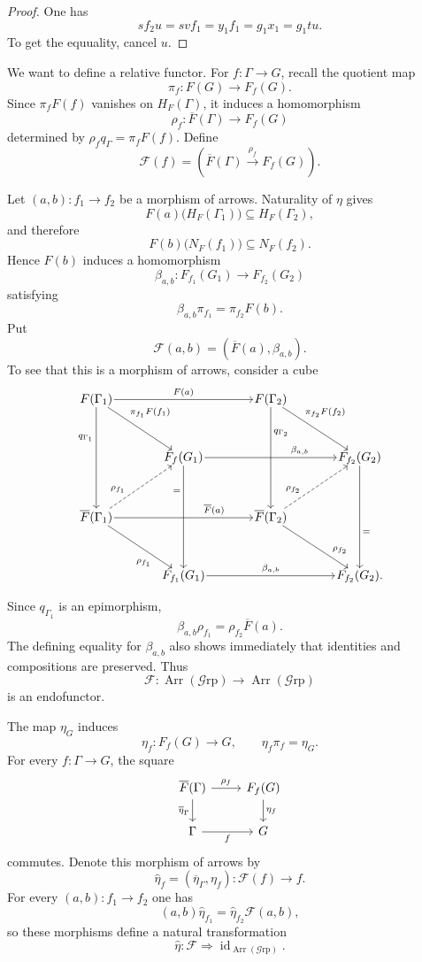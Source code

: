 \documentclass[10pt]{amsart}
\renewcommand{\*}{\cdot {\dots} \cdot}
\newcommand{\?}[1]{\overset{?}{#1}}
\newcommand{\id}{\operatorname{id}}
\newcommand{\Grp}{\mathcal{G}\text{rp}}
\numberwithin{equation}{section}
\begin{document}
\begin{proof}
One has
\[
sf_2u
=svf_1
=y_1f_1
=g_1x_1
=g_1tu.
\]
To get the equuality, cancel $u$.
\end{proof}
We want to define a relative functor. For $f\colon\Gamma\to G$, recall the quotient map
\[
\pi_f\colon F(G)\longrightarrow F_f(G).
\]
Since $\pi_fF(f)$ vanishes on $H_F(\Gamma)$, it induces a
homomorphism
\[
\rho_f\colon\overline F(\Gamma)\longrightarrow F_f(G)
\]
determined by $\rho_fq_\Gamma=\pi_fF(f)$.
Define
\[
\mathscr F(f)=
\left(
\overline F(\Gamma)\xrightarrow{\rho_f}F_f(G)
\right).
\]

Let $(a,b)\colon f_1\longrightarrow f_2$
be a morphism of arrows. Naturality of $\eta$ gives
\[
F(a)\bigl(H_F(\Gamma_1)\bigr)
\subseteq H_F(\Gamma_2),
\]
and therefore
\[
F(b)\bigl(N_F(f_1)\bigr)
\subseteq N_F(f_2).
\]
Hence $F(b)$ induces a homomorphism
\[
\beta_{a,b}\colon
F_{f_1}(G_1)\longrightarrow F_{f_2}(G_2)
\]
satisfying
\[
\beta_{a,b}\pi_{f_1}=\pi_{f_2}F(b).
\]
Put
\[
\mathscr F(a,b)=(\overline F(a),\beta_{a,b}).
\]
To see that this is a morphism of arrows, consider a cube
\[
\begin{tikzcd}[
  row sep=3.5em,
  column sep=3.8em,
  cells={nodes={inner sep=1pt}}
]
F(\Gamma_1)
  \arrow[rr,"F(a)"]
  \arrow[dd,"q_{\Gamma_1}"' {pos=0.30}]
  \arrow[dr,"\pi_{f_1}F(f_1)" {pos=0.30}]
&&
F(\Gamma_2)
  \arrow[dd,"q_{\Gamma_2}" {pos=0.25}]
  \arrow[dr,"\pi_{f_2}F(f_2)" {pos=0.30}]
&
\\
&
F_f(G_1)
  \arrow[rr,"\beta_{a,b}" {pos=0.72}]
  \arrow[dd,"="' {pos=0.25}]
&&
F_{f_2}(G_2)
  \arrow[dd,"=" {pos=0.65}]
\\
\overline F(\Gamma_1)
  \arrow[rr,swap,"\overline F(a)"' {pos=0.72}]
  \arrow[dr,"\rho_{f_1}"' {pos=0.72}]
  \arrow[ur,dashed,"\rho_{f_1}" {pos=0.30}]
&&
\overline F(\Gamma_2)
  \arrow[dr,swap, "\rho_{f_2}"' {pos=0.72}]
  \arrow[ur,dashed,"\rho_{f_2}" {pos=0.30}]
&
\\
&
F_{f_1}(G_1)
  \arrow[rr,swap,"\beta_{a,b}"']
&&
F_{f_2}(G_2) .
\end{tikzcd}
\]

Since $q_{\Gamma_1}$ is an epimorphism,
\[
\beta_{a,b}\rho_{f_1}
=
\rho_{f_2}\overline F(a).
\]
The defining equality for $\beta_{a,b}$ also shows immediately
that identities and compositions are preserved. Thus
\[
\mathscr F\colon\operatorname{Arr}(\Grp)
\longrightarrow\operatorname{Arr}(\Grp)
\]
is an endofunctor.

The map $\eta_G$ induces
\[
\eta_f\colon F_f(G)\longrightarrow G,
\qquad
\eta_f\pi_f=\eta_G.
\]
For every $f\colon\Gamma\to G$, the square
\[
\begin{tikzcd}
\overline F(\Gamma)
    \arrow[r,"\rho_f"]
    \arrow[d,"\overline\eta_\Gamma"']
&
F_f(G)
    \arrow[d,"\eta_f"]
\\
\Gamma
    \arrow[r,"f"']
&
G
\end{tikzcd}
\]
commutes. Denote this morphism of arrows by
\[
\widehat\eta_f
=
(\overline\eta_\Gamma,\eta_f)
\colon
\mathscr F(f)\longrightarrow f.
\]
For every $(a,b)\colon f_1\to f_2$ one has
\[
(a,b)\widehat\eta_{f_1}
=
\widehat\eta_{f_2}\mathscr F(a,b),
\]
so these morphisms define a natural transformation
\[
\widehat\eta\colon
\mathscr F\Longrightarrow\id_{\operatorname{Arr}(\Grp)}.
\]
\end{document}
